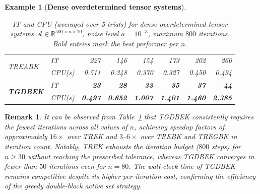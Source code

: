 \documentclass[11pt]{article}
\newtheorem{example}[theorem]{Example}
\newtheorem{remark}[theorem]{Remark}
\def\fm#1{\mathcal{#1}}
\begin{document}
\begin{example}[\textbf{Dense overdetermined tensor systems}]
\begin{table}[htbp]
\begin{tabular}{llrrrrrr}
\midrule
\multirow{2}{*}{TREABK}
  & IT     & 227   & 146   & 154   & 173   & 202   & 260   \\
  & CPU(s) & 0.511 & 0.348 & 0.370 & 0.327 & 0.450 & 0.494 \\
\midrule
\multirow{2}{*}{\textbf{TGDBEK}}
  & IT     & \textbf{23} & \textbf{28} & \textbf{33} & \textbf{35} & \textbf{37} & \textbf{44} \\
  & CPU(s) & \textbf{0.497} & \textbf{0.652} & \textbf{1.007} & \textbf{1.401} & \textbf{1.460} & \textbf{2.385} \\
\bottomrule
\end{tabular}
\caption{IT and CPU (averaged over 5 trials) for dense overdetermined tensor systems $\fm A\in\mathbb{R}^{500\times n\times 10}$, noise level $a=10^{-3}$, maximum $800$ iterations. Bold entries mark the best performer per $n$.}
\label{tab:ex1}
\end{table}
\end{example}
%
\begin{remark}
It can be observed from Table~\ref{tab:ex1} that TGDBEK consistently requires the fewest iterations across all values of $n$, achieving speedup factors of approximately $16\times$ over TREK and $3$--$6\times$ over TREBK and TREGBK in iteration count. Notably, TREK exhausts the iteration budget ($800$ steps) for $n\geq 30$ without reaching the prescribed tolerance, whereas TGDBEK converges in fewer than $50$ iterations even for $n=80$. The wall-clock time of TGDBEK remains competitive despite its higher per-iteration cost, confirming the efficiency of the greedy double-block active set strategy.
\end{remark}
\end{document}
